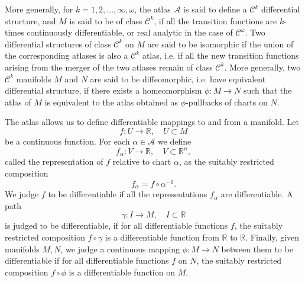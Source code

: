 \documentclass[12pt]{article}
\newcommand{\reals}{\mathbb{R}}
\newcommand{\cA}{\mathcal{A}}
\newcommand{\cC}{\mathcal{C}}
\begin{document}
More generally, for $k=1,2,\ldots,\infty,\omega$, the atlas $\cA$ is
said to define a $\cC^k$ differential structure, and $M$ is said to be
of class $\cC^k$, if all the transition functions are $k$-times
continuously differentiable, or real analytic in the case of
$\cC^\omega$.  Two differential structures of class $\cC^k$ on $M$ are
said to be isomorphic if the union of the corresponding atlases is
also a $\cC^k$ atlas, i.e. if all the new transition functions arising
from the merger of the two atlases remain of class $\cC^k$.  More
generally, two $\cC^k$ manifolds $M$ and $N$ are said to be
diffeomorphic, i.e.  have equivalent differential structure, if there
exists a homeomorphism $\phi:M\to N$ such that the atlas of $M$ is
equivalent to the atlas obtained as $\phi$-pullbacks of charts on $N$.

The atlas allows us to define differentiable mappings to and from a
manifold. Let
$$f:U\rightarrow\reals,\quad U\subset M$$
be a continuous function. For each $\alpha\in \cA$ we define
$$f_\alpha: V \rightarrow \reals,\quad V\subset\reals^n,$$
called the
representation of $f$ relative to chart $\alpha$, as the suitably
restricted composition
$$f_\alpha = f\circ \alpha^{-1}.$$
We judge $f$ to be differentiable if all
the representations $f_\alpha$ are differentiable. A path
$$\gamma: I\rightarrow M,\quad I\subset\reals$$
is judged to be differentiable, if for all differentiable
functions
$f$, the suitably restricted composition $f\circ\gamma$ is a
differentiable function from $\reals$ to $\reals$. Finally, given
manifolds $M, N$, we judge a continuous mapping $\phi:M\rightarrow
N$
between them to be differentiable if for all differentiable
functions
$f$ on $N$, the suitably restricted composition $f\circ\phi$ is a
differentiable function on $M$.
\end{document}
